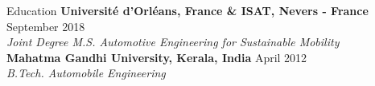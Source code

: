 \documentclass{resume} %
\begin{document}
%		
	\begin{rSection}{Education}
	{\bf Université d'Orléans, France \& ISAT, Nevers - France} \hfill {September 2018} \\ 
	{\small \emph{Joint Degree M.S. Automotive Engineering for Sustainable Mobility}} \\
	
	{\bf Mahatma Gandhi University, Kerala, India} \hfill {April 2012} \\ 
	{\small \emph{B.Tech. Automobile Engineering }}
\end{rSection}
\end{document}
